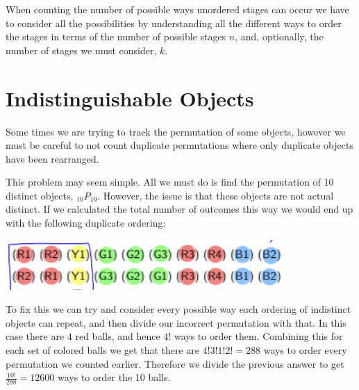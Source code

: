 \documentclass{report}
\begin{document}
    When counting the number of possible ways unordered stages can occur we have to consider all the possibilities by understanding all the different ways to order the stages in terms of the number of possible stages $n$, and, optionally, the number of stages we must consider, $k$.



    \section{Indistinguishable Objects}

    Some times we are trying to track the permutation of some objects, however we must be careful to not count duplicate permutations where only duplicate objects have been rearranged.


    This problem may seem simple. All we must do is find the permutation of 10 distinct objects, $_{10}P_{10}$. However, the issue is that these objects are not actual distinct. If we calculated the total number of outcomes this way we would end up with the following duplicate ordering:
    \begin{center}
        \includegraphics{2022-12-16-12-30-26.png}    
    \end{center}
    To fix this we can try and consider every possible way each ordering of indistinct objects can repeat, and then divide our incorrect permutation with that. In this case there are $4$ red balls, and hence $4!$ ways to order them. Combining this for each set of colored balls we get that there are $4!3!1!2!=288$ ways to order every permutation we counted earlier. Therefore we divide the previous answer to get $\frac{10!}{288}=12600$ ways to order the 10 balls.
\end{document}
